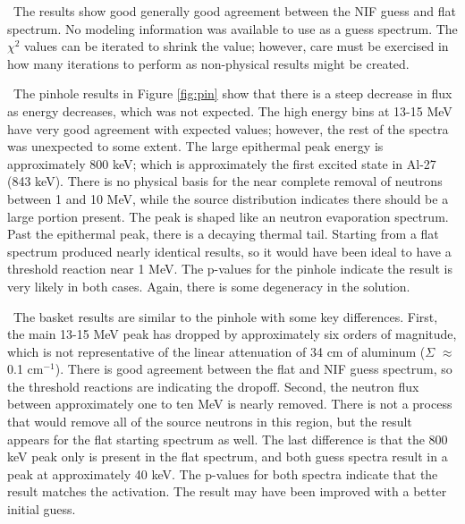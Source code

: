 \documentclass[journal]{IEEEtran}
\begin{document}
{	\ The results show good generally good agreement between the NIF guess and flat spectrum. 
No modeling information was available to use as a guess spectrum. %
The $\chi^{2}$ values can be iterated to shrink the value; however, care must be exercised in how many iterations to perform as non-physical results might be created. 
	
	\ The pinhole results in Figure \ref{fig:pin} show that there is a steep decrease in flux as energy decreases, which was not expected.  %
The high energy bins at 13-15 MeV have very good agreement with expected values; however, the rest of the spectra was unexpected to some extent. 
The large epithermal peak energy is approximately 800 keV; which is approximately the first excited state in Al-27 (843 keV).
There is no physical basis for the near complete removal of neutrons between 1 and 10 MeV, while the source distribution indicates there should be a large portion present. 
The peak is shaped like an neutron evaporation spectrum. Past the epithermal peak, there is a decaying thermal tail. 
Starting from a flat spectrum produced nearly identical results, so it would have been ideal to have a threshold reaction near 1 MeV. 
The p-values for the pinhole indicate the result is very likely in both cases. %
Again, there is some degeneracy in the solution. 
	
	\ The basket results are similar to the pinhole with some key differences. 
First, the main 13-15 MeV peak has dropped by approximately six orders of magnitude, which is not representative of the linear attenuation of 34 cm of aluminum ($\Sigma$ $\approx$ 0.1 cm$^{-1}$). 
There is good agreement between the flat and NIF guess spectrum, so the threshold reactions are indicating the dropoff. 
Second, the neutron flux between approximately one to ten MeV is nearly removed. 
There is not a process that would remove all of the source neutrons in this region, but the result appears for the flat starting spectrum as well. 
The last difference is that the 800 keV peak only is present in the flat spectrum, and both guess spectra result in a peak at approximately 40 keV. 
The p-values for both spectra indicate that the result matches the activation. 
The result may have been improved with a better initial guess. 
	
}
\end{document}
